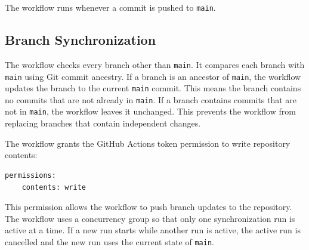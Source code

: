 The workflow runs whenever a commit is pushed to \texttt{main}.

\subsection{Branch Synchronization}

The workflow checks every branch other than \texttt{main}. It compares each branch with \texttt{main} using Git commit ancestry. If a branch is an ancestor of \texttt{main}, the workflow updates the branch to the current \texttt{main} commit. This means the branch contains no commits that are not already in \texttt{main}. If a branch contains commits that are not in \texttt{main}, the workflow leaves it unchanged. This prevents the workflow from replacing branches that contain independent changes.

The workflow grants the GitHub Actions token permission to write repository contents:
\begin{verbatim}
permissions:
	contents: write
\end{verbatim}
This permission allows the workflow to push branch updates to the repository. The workflow uses a concurrency group so that only one synchronization run is active at a time. If a new run starts while another run is active, the active run is cancelled and the new run uses the current state of \texttt{main}.

